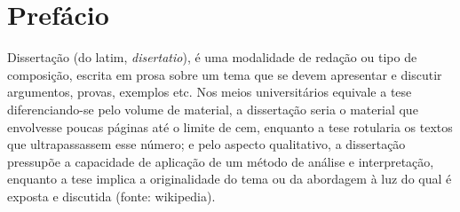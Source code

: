 \chapter*[Prefácio]{Prefácio}

Dissertação (do latim, \emph{disertatio}), é uma modalidade de redação ou tipo de composição, escrita em prosa sobre um tema que se devem apresentar e discutir argumentos, provas, exemplos etc. Nos meios universitários equivale a tese diferenciando-se pelo volume de material, a dissertação seria o material que envolvesse poucas páginas até o limite de cem, enquanto a tese rotularia os textos que ultrapassassem esse número; e pelo aspecto qualitativo, a dissertação pressupõe a capacidade de aplicação de um método de análise e interpretação, enquanto a tese implica a originalidade do tema ou da abordagem à luz do qual é exposta e discutida (fonte: wikipedia).